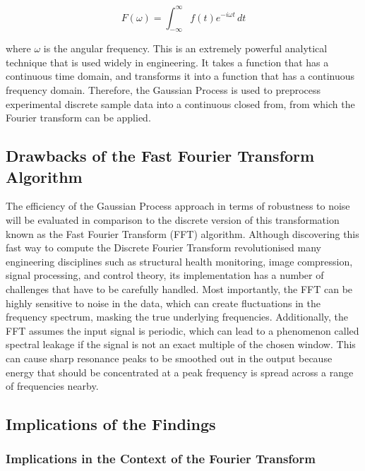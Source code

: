 \documentclass[12pt]{article}
\begin{document}
    \begin{equation}
        F(\omega) = \int_{-\infty}^{\infty} f(t) e^{-i \omega t} \, dt\label{eq:ft}
    \end{equation}


    where $\omega$ is the angular frequency.
    This is an extremely powerful analytical technique that is used widely in engineering.
    It takes a function that has a continuous time domain, and transforms it into a function that has a continuous frequency domain.
    Therefore, the Gaussian Process is used to preprocess experimental discrete sample data into a continuous closed from, from which the Fourier transform can be applied.

    \subsection{Drawbacks of the Fast Fourier Transform Algorithm}
    The efficiency of the Gaussian Process approach in terms of robustness to noise will be evaluated in comparison to the discrete version of this transformation known as the Fast Fourier Transform (FFT) algorithm.
    Although discovering this fast way to compute the Discrete Fourier Transform revolutionised many engineering disciplines such as structural health monitoring, image compression, signal processing, and control theory\cite{Byjus2023}, its implementation has a number of challenges that have to be carefully handled.
    Most importantly, the FFT can be highly sensitive to noise in the data, which can create fluctuations in the frequency spectrum, masking the true underlying frequencies\cite{MathStackExchange2023}.
    Additionally, the FFT assumes the input signal is periodic, which can lead to a phenomenon called spectral leakage if the signal is not an exact multiple of the chosen window\cite{MathStackExchange2023}.
    This can cause sharp resonance peaks to be smoothed out in the output because energy that should be concentrated at a peak frequency is spread across a range of frequencies nearby.

    \subsection{Implications of the Findings}

    \subsubsection{Implications in the Context of the Fourier Transform}
\end{document}
